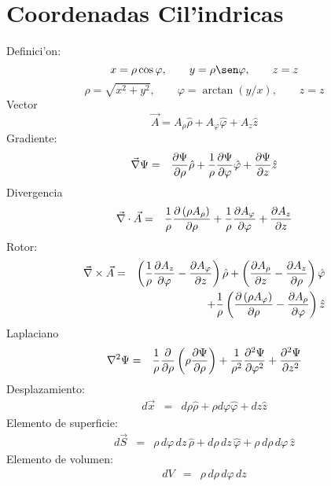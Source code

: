 \section{Coordenadas Cil'indricas}
Definici'on:
\begin{equation}
    x  =  \rho\cos\varphi , \qquad
    y  =  \rho\sen\varphi , \qquad
    z =  z
\end{equation}
\begin{equation}
    \rho  =  \sqrt{x^2 + y^2} , \qquad
    \varphi  = \arctan{(y/x)}, \qquad
     z=  z
\end{equation}
Vector
\begin{equation}
\vec{A} =A_\rho {\hat \rho} + A_\varphi {\hat \varphi} +
A_z {\hat z}
\end{equation}
Gradiente:
\begin{eqnarray}
 \vec\nabla\Psi&=&{\partial\Psi\over \partial \rho} {\hat \rho}
  + {1 \over \rho}{\partial\Psi\over \partial \varphi} {\hat \varphi}
  + {\partial\Psi\over \partial z} {\hat z}
\end{eqnarray}
Divergencia
\begin{eqnarray}
 \vec\nabla \cdot \vec{A}
&=&  {1 \over \rho}{\partial \left( \rho A_\rho  \right) \over \partial
\rho}  + {1 \over \rho}{\partial A_\varphi \over \partial \varphi}
  + {\partial A_z \over \partial z}
\end{eqnarray}
Rotor:
\begin{eqnarray}
\vec\nabla \times  \vec{A}
&=&   \left({1 \over \rho}{\partial A_z \over \partial \varphi}
    - {\partial A_\varphi \over \partial z}\right)  {\hat \rho} +
\left({\partial A_\rho \over \partial z} - {\partial A_z \over
\partial \rho}\right)  {\hat \varphi} \nonumber\\
&&+  {1 \over \rho}\left({\partial \left( \rho A_\varphi \right) \over
\partial \rho}     - {\partial A_\rho \over \partial \varphi}\right) {\hat z}
\end{eqnarray}
Laplaciano
\begin{eqnarray}
 \nabla^2 \Psi
&=& {1 \over \rho}{\partial \over \partial \rho}\left(\rho {\partial\Psi\over
\partial \rho}\right)
  + {1 \over \rho^2}{\partial^2\Psi\over \partial \varphi^2}
  + {\partial^2\Psi\over \partial z^2} \\
\end{eqnarray}
Desplazamiento:
\begin{eqnarray}
 d \vec{x}
 &=& d\rho {\hat \rho} + \rho d\varphi {\hat \varphi} +dz {\hat z}
\end{eqnarray}
Elemento de superficie:
\begin{eqnarray}
 d \vec{S}
&=& \rho\, d\varphi\, dz\, {\hat \rho} + d\rho
\,dz\, {\hat \varphi} +  \rho \,d\rho\, d\varphi \, {\hat z}
\end{eqnarray}
Elemento de volumen:
\begin{eqnarray}
 dV
 &=& \rho\, d\rho\, d\varphi\, dz
\end{eqnarray}


